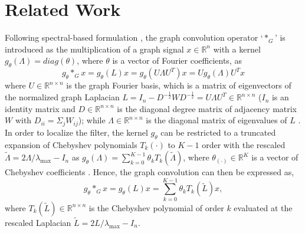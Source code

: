 \documentclass[sigconf,screen]{acmart}
\begin{document}
\section{Related Work}
Following spectral-based formulation \cite{bruna2013spectral,niepert2016learning,defferrard2016convolutional}, the graph convolution operator `$*_G$' is introduced as the multiplication of a graph signal $x \in \mathbb{R}^n$ with a kernel $g_{\theta} (\Lambda) = diag(\theta)$, where $\theta$ is a vector of Fourier coefficients, as
\begin{equation}
\label{eq:gconv}
g_{\theta} *_G x = g_{\theta} (L) x = g_{\theta} (U \Lambda U^{T}) x = U g_{\theta} (\Lambda) U^{T} x
\end{equation}
where $U \in \mathbb{R}^{n \times n}$ is the graph Fourier basis, which is a matrix of eigenvectors of the normalized graph Laplacian $L = I_n - D^{-\frac{1}{2}} W D^{-\frac{1}{2}}=U \Lambda U^{T} \in \mathbb{R}^{n \times n}$ ($I_n$ is an identity matrix and $D \in \mathbb{R}^{n \times n}$ is the diagonal degree matrix of adjacency matrix $W$ with $D_{i i}=\Sigma_{j} W_{i j}$); while $\Lambda \in \mathbb{R}^{n \times n}$ is the diagonal matrix of eigenvalues of $L$ \cite{shuman2012emerging}. In order to localize the filter, the kernel $g_{\theta}$ can be restricted to a truncated expansion of Chebyshev polynomials $T_k(\cdot)$ to $K-1$ order with the rescaled $\tilde{\Lambda} = 2\Lambda / \lambda_{\max} - I_{n}$ as $g_{\theta} (\Lambda) = \sum_{k=0}^{K-1} \theta_{k} T_{k} (\tilde{\Lambda})$, where $\theta_{(\cdot)} \in \mathbb{R}^{K}$ is a vector of Chebyshev coefficients \cite{hammond2011wavelets}. Hence, the graph convolution can then be expressed as,
\begin{equation}
\label{eq:cheb}
g_{\theta} *_G x = g_{\theta} (L) x = \sum_{k=0}^{K-1} \theta_{k} T_{k} (\tilde{L}) x,
\end{equation}
where $T_{k} (\tilde{L}) \in \mathbb{R}^{n \times n}$ is the Chebyshev polynomial of order $k$ evaluated at the rescaled Laplacian $\tilde{L} = 2L / \lambda_{\max} - I_{n}$.
\end{document}
